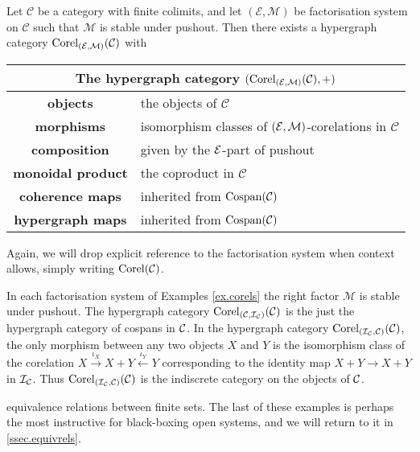 \begin{theorem} \label{thm.cospantocorel}
  Let $\mathcal C$ be a category with finite colimits, and let $(\mathcal E,
  \mathcal M)$ be factorisation system on $\mathcal C$ such that $\mathcal M$ is
  stable under pushout. Then there exists a hypergraph category
  $\mathrm{Corel}_{(\mathcal E,\mathcal M)}(\mathcal C)$ with 
  \smallskip

  \begin{center}
    \begin{tabular}{| c | p{} |}
      \hline
      \multicolumn{2}{|c|}{The hypergraph category $(\mathrm{Corel}_{(\mathcal E,\mathcal M)}(\mathcal C),+)$} \\
      \hline
      \textbf{objects} & the objects of $\mathcal C$ \\ 
      \textbf{morphisms} & isomorphism classes of $(\mathcal E,\mathcal M)$-corelations in $\mathcal C$\\ 
      \textbf{composition} & given by the $\mathcal E$-part of pushout \\
      \textbf{monoidal product} & the coproduct in $\mathcal C$ \\
      \textbf{coherence maps} & inherited from $\operatorname{{Cospan}}(\mathcal C)$  \\
      \textbf{hypergraph maps} & inherited from $\operatorname{{Cospan}}(\mathcal C)$ \\
      \hline
    \end{tabular}
  \end{center}  
  \smallskip
\end{theorem}

Again, we will drop explicit reference to the factorisation system when context allows, simply writing $\mathrm{Corel}(\mathcal C)$.

\begin{examples} \label{ex.corelcats}
In each factorisation system of Examples \ref{ex.corels} the right factor
$\mathcal M$ is stable under pushout. The hypergraph category 
$\operatorname{{Corel}}_{(\mathcal C,\mathcal I_{\mathcal C})}(\mathcal C)$ is the just the hypergraph category of
cospans in $\mathcal C$. In the hypergraph category $\operatorname{{Corel}}_{(\mathcal I_{\mathcal C},\mathcal
C)}(\mathcal C)$, the only morphism between any two objects $X$ and $Y$ is the
isomorphism class of the corelation $X \xrightarrow{\iota_X} X+Y
\xleftarrow{\iota_Y} Y$ corresponding to the identity map $X+Y \to X+Y$ in $\mathcal
I_{\mathcal C}$. Thus $\operatorname{{Corel}}_{(\mathcal I_{\mathcal C},\mathcal C)}(\mathcal C)$ is the indiscrete
category on the objects of $\mathcal C$. 

  equivalence relations between finite sets. The last of these examples is
  perhaps the most instructive for black-boxing open systems, and we will return
  to it in \textsection\ref{ssec.equivrels}.
\end{examples}


